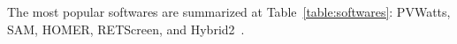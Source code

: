 \documentclass[review]{elsarticle}
\begin{document}
The most popular softwares are summarized at Table~\ref{table:softwares}: PVWatts, SAM, HOMER, RETScreen, and Hybrid2~\citep{Pradhan,Swarnkar,NRELDobos,NRELBlair,Mills}.
%
\end{document}
